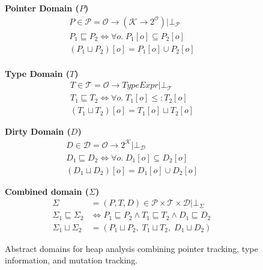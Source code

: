 \newcommand{\defeq}{\overset{\text{\tiny def}}{=}}

\begin{figure*}[t]
\centering

\begin{minipage}[t]{0.32\textwidth}
\centering
\textbf{Pointer Domain ($P$)}
\begin{gather*}
P \in \mathcal{P} = \mathcal{O} \to (\mathcal{K} \to 2^{\mathcal{O}}) | \bot_\mathcal{P} \\[0.3em]
P_1 \sqsubseteq P_2 \iff \forall o.\; P_1[o] \subseteq P_2[o] \\[0.3em]
(P_1 \sqcup P_2)[o] = P_1[o] \cup P_2[o] \\
\end{gather*}
\end{minipage}%
\hfill
\begin{minipage}[t]{0.32\textwidth}
\centering
\textbf{Type Domain ($T$)}
\begin{gather*}
T \in \mathcal{T} = \mathcal{O} \to \mathit{TypeExpr} | \bot_\mathcal{T} \\[0.3em]
T_1 \sqsubseteq T_2 \iff \forall o.\; T_1[o] \leq: T_2[o] \\[0.3em]
(T_1 \sqcup T_2)[o] = T_1[o] \sqcup T_2[o]
\end{gather*}
\end{minipage}%
\hfill
\begin{minipage}[t]{0.32\textwidth}
\centering
\textbf{Dirty Domain ($D$)}
\begin{gather*}
D \in \mathcal{D} = \mathcal{O} \to 2^{\mathcal{K}} | \bot_\mathcal{D} \\[0.3em]
D_1 \sqsubseteq D_2 \iff \forall o.\; D_1[o] \subseteq D_2[o] \\[0.3em]
(D_1 \sqcup D_2)[o] = D_1[o] \cup D_2[o]
\end{gather*}
\end{minipage}

\vspace{1.5em}

\noindent\textbf{Combined domain ($\Sigma$)}
\begin{align*}
\Sigma &= (P,T,D) \in \mathcal{P} \times \mathcal{T} \times \mathcal{D} | \bot_\Sigma\\[0.3em]
\Sigma_1 \sqsubseteq \Sigma_2 &\iff P_1 \sqsubseteq P_2 \land T_1 \sqsubseteq T_2 \land D_1 \sqsubseteq D_2 \\[0.3em]
\Sigma_1 \sqcup \Sigma_2 &= (P_1 \sqcup P_2,\; T_1 \sqcup T_2,\; D_1 \sqcup D_2)
\end{align*}

\caption{Abstract domains for heap analysis combining pointer tracking, type information, and mutation tracking.}
\label{fig:abstract-domains}
\end{figure*}

